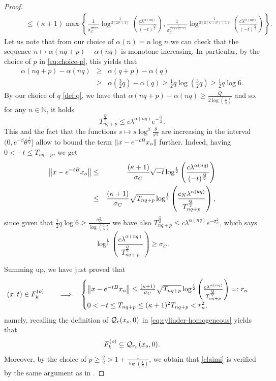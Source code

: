 \documentclass{amsart}
\numberwithin{equation}{section}
\begin{document}
{\begin{proof}
\begin{eqnarray*}
&& \quad \leq (\kappa+1)\max{\left\{\frac{1}{\sigma_C^\frac{1}{2\vartheta +1} }\log^{\frac{1}{2(2\vartheta+1)}}{\left(\frac{c\lambda^{\alpha(nq)}}{(-t)^{\frac{Q}{2}}}\right)}, \frac{1}{\sigma_C^\frac{1}{2(\kappa+\vartheta)+1}}\log^{\frac{1}{2(2(\kappa+\vartheta)+1)}}{\left(\frac{c\lambda^{\alpha(nq)}}{(-t)^{\frac{Q}{2}}}\right)}\right\}}.
\end{eqnarray*}
Let us note that from our choice of $\alpha(n)=n\log{n}$ we can check that the sequence $n \mapsto \alpha(nq+p)-\alpha(nq)$ is monotone increasing. In particular, by the choice of $p$ in \eqref{eq:choice-p}, this yields that 
\begin{eqnarray*}
    \alpha(nq+p)-\alpha(nq) & \geq &  \alpha(q+p)-\alpha(q)\\
    & \geq & \alpha\left(\frac{3}{2}q\right)-\alpha(q)  \geq  \frac{1}{2}q\log{\left(\frac{3}{2}q\right)}\geq\frac{1}{2}q\log{6}.
\end{eqnarray*}
By our choice of $q$ \eqref{def:q}, we have that $\alpha(nq+p)-\alpha(nq)\geq\frac{Q}{2\log{(\frac{1}{\lambda})}}$ and so, for any $n \in \mathbb{N}$, it holds
\[
T_{nq+p}^{\frac{Q}{2}} 
 \leq  c\lambda^{\alpha(nq)}e^{-\frac{Q}{2}}.
\]
This and the fact that the functions $s\mapsto s\log^{\beta}\frac{\theta}{s^Q}$ are increasing in the interval $(0,e^{-\beta}\theta^{\frac{1}{Q}}]$ allow to bound the term $\|x-e^{-tB}x_{\rm o}\|$ further. Indeed, having $0<-t\leq T_{nq+p}$, we get
\begin{eqnarray*}
\left\|x-e^{-tB}x_{\rm o}\right\| & \leq &\frac{(\kappa+1)}{\sigma_C} \sqrt{-t}\log^{\frac{1}{2}}{\left(\frac{c\lambda^{\alpha(nq)}}{(-t)^{\frac{Q}{2}}}\right)}\\
& \leq & \frac{(\kappa+1)}{\sigma_C}\sqrt{T_{nq+p}}\log^{\frac{1}{2}}{\left(\frac{c_N\lambda^{\alpha(kq)}}{T_{nq+p}^{\frac{Q}{2}}}\right)}\,,
\end{eqnarray*}
 since given that $\frac{1}{2}q\log{6}\geq \frac{\sigma^2_C}{\log{(\frac{1}{\lambda})}}$ we have also $T_{nq+p}^{\frac{Q}{2}}\leq c\lambda^{\alpha(nq)}e^{-\sigma_C^2}$, which says 
\[
\log^{\frac{1}{2}}{\left(\frac{c\lambda^{\alpha(nq)}}{T_{nq+p}^{\frac{Q}{2}}}\right)}\geq \sigma_C.
\] 


Summing up, we have just proved that
\[
(x,t)\in F_k^{( {\rm o})}\qquad\Longrightarrow\quad\begin{cases}
\left\|x-e^{-tB}x_{\rm o}\right\|\leq\frac{(\kappa+1)}{\sigma_C}\sqrt{T_{nq+p}}\log^{\frac{1}{2}}{\left(\frac{c\lambda^{\alpha(nq)}}{T_{nq+p}^{\frac{Q}{2}}}\right)}=:r_n\\
0<-t\leq T_{nq+p}\leq (\kappa+1)^2T_{nq+p} < r_n^2,&  \,
\end{cases}
\]
namely, recalling the definition of $\mathcal{Q}_r(x_{\rm o},0)$ in \eqref{eq:cylinder-homogeneous} yields that
$$
F_k^{( {\rm o})}\subseteq \mathcal{Q}_{r_n}(x_{\rm o},0).
$$
Moreover, by the choice of  $p\geq\frac{q}{2}>1+\frac{1}{\log(\frac{1}{\lambda})}$, we obtain that \eqref{claimi} is verified by the same argument as in \cite[Lemma 6.2]{KLT18}.
\end{proof}


}
\end{document}
